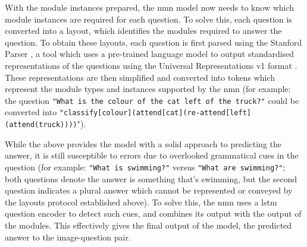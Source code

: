 With the module instances prepared, the \gls{nmn} model now needs to know which module instances are required for each question.
To solve this, each question is converted into a layout, which identifies the modules required to answer the question.
To obtain these layouts, each question is first parsed using the Stanford Parser \cite{klein_accurate_2003}, a tool which uses a pre-trained language model to output standardised representations of the questions using the Universal Representations v1 format \cite{nivre_universal_2016}.
These representations are then simplified and converted into tokens which represent the module types and instances supported by the \gls{nmn} (for example: the question \texttt{"What is the colour of the cat left of the truck?"} could be converted into \texttt{"classify[colour](attend[cat](re-attend[left](attend(truck))))}").

While the above provides the model with a solid approach to predicting the answer, it is still susceptible to errors due to overlooked grammatical cues in the question (for example: \texttt{"What is swimming?"} versus \texttt{"What are swimming?"}; both questions denote the answer is something that's swimming, but the second question indicates a plural answer which cannot be represented or conveyed by the layouts protocol established above).
To solve this, the \gls{nmn} uses a \acrlong{lstm} question encoder to detect such cues, and combines its output with the output of the modules.
This effectively gives the final output of the model, the predicted answer to the image-question pair.

